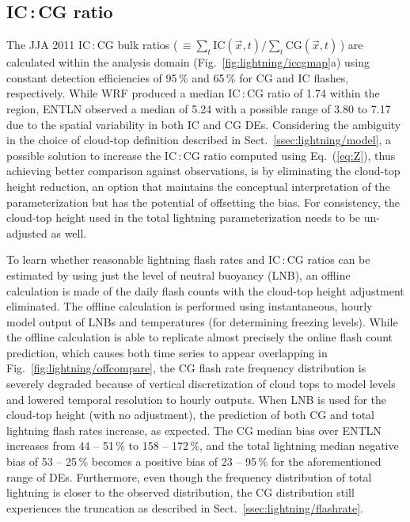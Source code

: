 \subsection{IC\,:\,CG ratio}\label{ssec:lightning/ratio}

The JJA 2011 IC\,:\,CG bulk ratios (\,$\equiv\sum_t \textrm{IC}(\vec{x},t)/\sum_t
\textrm{CG}(\vec{x},t)$\,) are calculated within the analysis domain
(Fig.~\ref{fig:lightning/iccgmap}a) using constant detection efficiencies of 95\,{\%}
and 65\,{\%} for CG and IC flashes, respectively. While WRF produced a median
IC\,:\,CG ratio of 1.74 within the region, ENTLN observed a median of 5.24
with a possible range of 3.80 to 7.17 due to the spatial variability in both
IC and CG DEs. Considering the ambiguity in the choice of cloud-top
definition described in Sect.~\ref{ssec:lightning/model}, a possible solution to
increase the IC\,:\,CG ratio computed using Eq.~(\ref{eq:Z}), thus achieving
better comparison against observations, is by eliminating the cloud-top
height reduction, an option that maintains the conceptual interpretation of
the parameterization but has the potential of offsetting the bias. For
consistency, the cloud-top height used in the total lightning
parameterization needs to be un-adjusted as well.

To learn whether reasonable lightning flash rates and IC\,:\,CG ratios can be
estimated by using just the level of neutral buoyancy (LNB), an offline
calculation is made of the daily flash counts with the cloud-top height
adjustment eliminated. The offline calculation is performed using
instantaneous, hourly model output of LNBs and temperatures (for determining
freezing levels). While the offline calculation is able to replicate almost
precisely the online flash count prediction, which causes both time series to
appear overlapping in Fig.~\ref{fig:lightning/offcompare}, the CG flash rate
frequency distribution is severely degraded because of vertical
discretization of cloud tops to model levels and lowered temporal resolution
to hourly outputs. When LNB is used for the cloud-top height (with no
adjustment), the prediction of both CG and total lightning flash rates
increase, as expected. The CG median bias over ENTLN increases from 44 --
51\,{\%} to 158 -- 172\,{\%}, and the total lightning median negative bias of
53 -- 25\,{\%} becomes a positive bias of 23 -- 95\,{\%} for the
aforementioned range of DEs. Furthermore, even though the frequency
distribution of total lightning is closer to the observed distribution, the
CG distribution still experiences the truncation as described in
Sect.~\ref{ssec:lightning/flashrate}.

